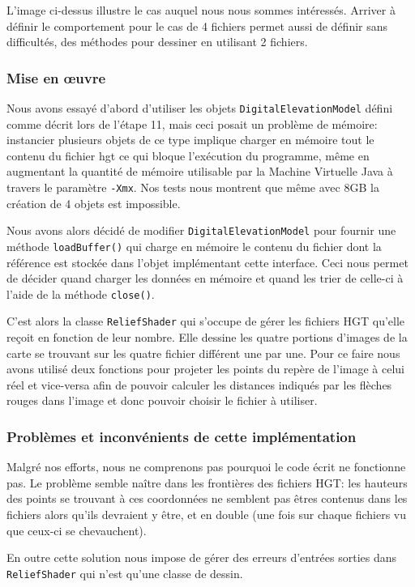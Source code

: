 \documentclass[11pt,a4paper]{article}
\begin{document}
L'image ci-dessus illustre le cas auquel nous nous sommes intéressés. Arriver à définir le comportement pour le cas de 4 fichiers permet aussi de définir sans difficultés, des méthodes pour dessiner en utilisant 2 fichiers.

\subsubsection*{Mise en œuvre}
Nous avons essayé d'abord d'utiliser les objets \texttt{DigitalElevationModel} défini comme décrit lors de l'étape 11, mais ceci posait un problème de mémoire: instancier plusieurs objets de ce type implique charger en mémoire tout le contenu du fichier hgt ce qui bloque l'exécution du programme, même en augmentant la quantité de mémoire utilisable par la Machine Virtuelle Java à travers le paramètre \texttt{-Xmx}. Nos tests nous montrent que même avec 8GB la création de 4 objets est impossible.

Nous avons alors décidé de modifier \texttt{DigitalElevationModel} pour fournir une méthode \texttt{loadBuffer()} qui charge en mémoire le contenu du fichier dont la référence est stockée dans l'objet implémentant cette interface. Ceci nous permet de décider quand charger les données en mémoire et quand les trier de celle-ci à l'aide de la méthode \texttt{close()}.

C'est alors la classe \texttt{ReliefShader} qui s'occupe de gérer les fichiers HGT qu'elle reçoit en fonction de leur nombre. Elle dessine les quatre portions d'images de la carte se trouvant sur les quatre fichier différent une par une. Pour ce faire nous avons utilisé deux fonctions pour projeter les points du repère de l'image à celui réel et vice-versa afin de pouvoir calculer les distances indiqués par les flèches rouges dans l'image et donc pouvoir choisir le fichier à utiliser.

\subsubsection*{Problèmes et inconvénients de cette implémentation}
Malgré nos efforts, nous ne comprenons pas pourquoi le code écrit ne fonctionne pas. Le problème semble naître dans les frontières des fichiers HGT: les hauteurs des points se trouvant à ces coordonnées ne semblent pas êtres contenus dans les fichiers alors qu'ils devraient y être, et en double (une fois sur chaque fichiers vu que ceux-ci se chevauchent).

En outre cette solution nous impose de gérer des erreurs d'entrées sorties dans \texttt{ReliefShader} qui n'est qu'une classe de dessin.
\end{document}
